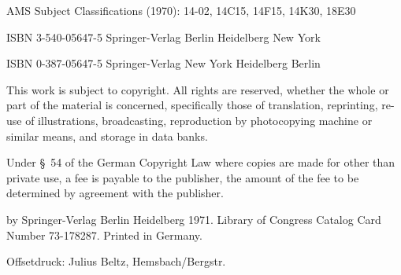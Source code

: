 AMS Subject Classifications (1970): 14-02, 14C15, 14F15, 14K30, 18E30

ISBN 3-540-05647-5 Springer-Verlag Berlin \textperiodcentered{} Heidelberg \textperiodcentered{} New York\par
ISBN 0-387-05647-5 Springer-Verlag New York \textperiodcentered{} Heidelberg \textperiodcentered{} Berlin

This work is subject to copyright. All rights are reserved, whether the whole
or part of the material is concerned, specifically those of translation,
reprinting, re-use of illustrations, broadcasting, reproduction by photocopying
machine or similar means, and storage in data banks.

Under \S~54 of the German Copyright Law where copies are made for other than
private use, a fee is payable to the publisher, the amount of the fee to be
determined by agreement with the publisher.

\textcopyright{} by Springer-Verlag Berlin \textperiodcentered{} Heidelberg 1971.
Library of Congress Catalog Card Number 73-178287. Printed in Germany.

Offsetdruck: Julius Beltz, Hemsbach/Bergstr.



